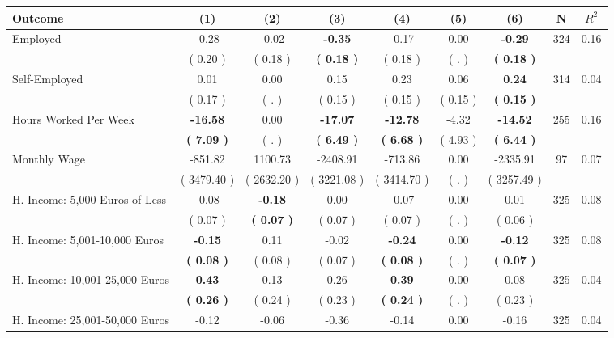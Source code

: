 \begin{tabular}{lcccccccc}
\toprule
 \textbf{Outcome} & \textbf{(1)} & \textbf{(2)} & \textbf{(3)} & \textbf{(4)} & \textbf{(5)} & \textbf{(6)} & \textbf{N} & \textbf{$ R^2$} \\
\midrule
Employed &     -0.28 &     -0.02 & \textbf{    -0.35} &     -0.17 &      0.00 & \textbf{    -0.29} & 324 &       0.16 \\ 
 & (     0.20 ) & (     0.18 ) & \textbf{(     0.18 )} & (     0.18 ) & (        . ) & \textbf{(     0.18 )} & \\
Self-Employed &      0.01 &      0.00 &      0.15 &      0.23 &      0.06 & \textbf{     0.24} & 314 &       0.04 \\ 
 & (     0.17 ) & (        . ) & (     0.15 ) & (     0.15 ) & (     0.15 ) & \textbf{(     0.15 )} & \\
Hours Worked Per Week & \textbf{   -16.58} &      0.00 & \textbf{   -17.07} & \textbf{   -12.78} &     -4.32 & \textbf{   -14.52} & 255 &       0.16 \\ 
 & \textbf{(     7.09 )} & (        . ) & \textbf{(     6.49 )} & \textbf{(     6.68 )} & (     4.93 ) & \textbf{(     6.44 )} & \\
Monthly Wage &   -851.82 &   1100.73 &  -2408.91 &   -713.86 &      0.00 &  -2335.91 & 97 &       0.07 \\ 
 & (  3479.40 ) & (  2632.20 ) & (  3221.08 ) & (  3414.70 ) & (        . ) & (  3257.49 ) & \\
H. Income: 5,000 Euros of Less &     -0.08 & \textbf{    -0.18} &      0.00 &     -0.07 &      0.00 &      0.01 & 325 &       0.08 \\ 
 & (     0.07 ) & \textbf{(     0.07 )} & (     0.07 ) & (     0.07 ) & (        . ) & (     0.06 ) & \\
H. Income: 5,001-10,000 Euros & \textbf{    -0.15} &      0.11 &     -0.02 & \textbf{    -0.24} &      0.00 & \textbf{    -0.12} & 325 &       0.08 \\ 
 & \textbf{(     0.08 )} & (     0.08 ) & (     0.07 ) & \textbf{(     0.08 )} & (        . ) & \textbf{(     0.07 )} & \\
H. Income: 10,001-25,000 Euros & \textbf{     0.43} &      0.13 &      0.26 & \textbf{     0.39} &      0.00 &      0.08 & 325 &       0.04 \\ 
 & \textbf{(     0.26 )} & (     0.24 ) & (     0.23 ) & \textbf{(     0.24 )} & (        . ) & (     0.23 ) & \\
H. Income: 25,001-50,000 Euros &     -0.12 &     -0.06 &     -0.36 &     -0.14 &      0.00 &     -0.16 & 325 &       0.04 \\ 

\end{tabular}
